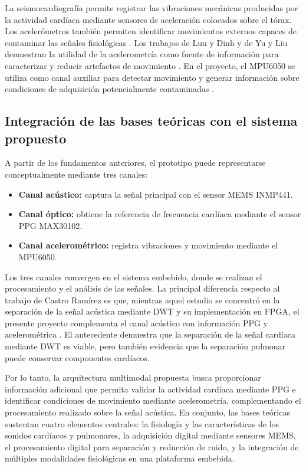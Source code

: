 La seismocardiografía permite registrar las vibraciones mecánicas producidas por la actividad cardíaca mediante sensores de aceleración colocados sobre el tórax. Los acelerómetros también permiten identificar movimientos externos capaces de contaminar las señales fisiológicas . Los trabajos de Luu y Dinh y de Yu y Liu demuestran la utilidad de la acelerometría como fuente de información para caracterizar y reducir artefactos de movimiento . En el proyecto, el MPU6050 se utiliza como canal auxiliar para detectar movimiento y generar información sobre condiciones de adquisición potencialmente contaminadas .

\subsection{Integración de las bases teóricas con el sistema propuesto}

A partir de los fundamentos anteriores, el prototipo puede representarse conceptualmente mediante tres canales:

\begin{itemize}
    \item \textbf{Canal acústico:} captura la señal principal con el sensor MEMS INMP441.
    \item \textbf{Canal óptico:} obtiene la referencia de frecuencia cardíaca mediante el sensor PPG MAX30102.
    \item \textbf{Canal acelerométrico:} registra vibraciones y movimiento mediante el MPU6050.
\end{itemize}

Los tres canales convergen en el sistema embebido, donde se realizan el procesamiento y el análisis de las señales. La principal diferencia respecto al trabajo de Castro Ramírez es que, mientras aquel estudio se concentró en la separación de la señal acústica mediante DWT y su implementación en FPGA, el presente proyecto complementa el canal acústico con información PPG y acelerométrica . El antecedente demuestra que la separación de la señal cardíaca mediante DWT es viable, pero también evidencia que la separación pulmonar puede conservar componentes cardíacos.

Por lo tanto, la arquitectura multimodal propuesta busca proporcionar información adicional que permita validar la actividad cardíaca mediante PPG e identificar condiciones de movimiento mediante acelerometría, complementando el procesamiento realizado sobre la señal acústica. En conjunto, las bases teóricas sustentan cuatro elementos centrales: la fisiología y las características de los sonidos cardíacos y pulmonares, la adquisición digital mediante sensores MEMS, el procesamiento digital para separación y reducción de ruido, y la integración de múltiples modalidades fisiológicas en una plataforma embebida.

